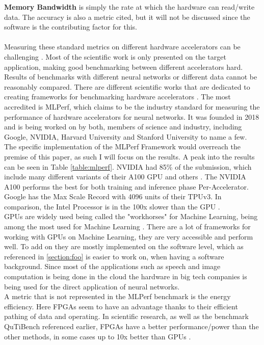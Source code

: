 \documentclass[conference]{IEEEtran}
\begin{document}
	\textbf{Memory Bandwidth} is simply the rate at which the hardware can read/write data.
	The accuracy is also a metric cited, but it will not be discussed since the software is the contributing factor for this.
	\\
	\\
	Measuring these standard metrics on different hardware accelerators can be challenging \cite{capra2020updated}. Most of the scientific work is only presented on the target application, making good benchmarking between different accelerators hard. Results of benchmarks with different neural networks or different data cannot be reasonably compared.
	There are different scientific works that are dedicated to creating frameworks for benchmarking hardware accelerators \cite{chen2012benchnn} \cite{zhu2018benchmarking} \cite{blott2019qutibench} \cite{dong2017dnnmark}. The most accredited is MLPerf, which claims to be the industry standard for measuring the performance of hardware accelerators for neural networks\cite{mattson2020mlperf}. It was founded in 2018 and is being worked on by both, members of science and industry, including Google, NVIDIA, Harvard University and Stanford University to name a few. The specific implementation of the MLPerf Framework would overreach the premise of this paper, as such I will focus on the results.
	A peak into the results can be seen in Table \ref{table:mlperf}. NVIDIA had 85\% of the submission, which include many different variants of their A100 GPU and others \cite{mlperfresultshpc}. The NVIDIA A100 performs the best for both training and inference phase Per-Accelerator. Google has the Max Scale Record with 4096 units of their TPUv3. In comparison, the Intel Processor is in the 100x slower than the GPU \cite{mlperfresultsnvidia}. 
	\\
	GPUs are widely used being called the "workhorses" for Machine Learning\cite{capra2020updated}, being among the most used for Machine Learning \cite{mostusedgpu}. There are a lot of frameworks for working with GPUs on Machine Learning, they are very accessible and perform well. To add on they are mostly implemented on the software level, which as referenced in \autoref{section:foo} is easier to work on, when having a software background.  Since most of the applications such as speech and image computation is being done in the cloud \cite{sze2017efficient} the hardware in big tech companies is being used for the direct application of neural networks.
	\\
	A metric that is not represented in the MLPerf benchmark is the energy efficiency. Here FPGAs seem to have an advantage thanks to their efficient pathing of data and operating. In scientific research, as well as the benchmark QuTiBench\cite{blott2019qutibench} referenced earlier, FPGAs have a better performance/power than the other methods, in some cases up to 10x better than GPUs \cite{ovtcharov2015accelerating} \cite{capra2020updated}. 
\end{document}
